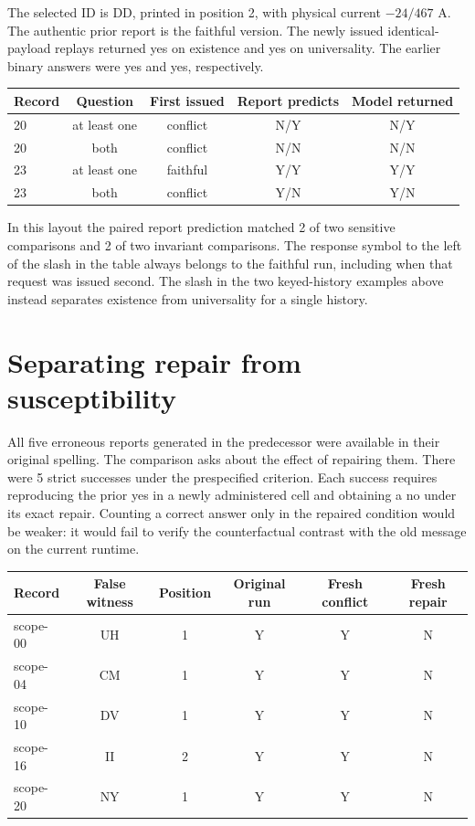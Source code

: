 \documentclass[12pt,letterpaper]{article}
\begin{document}
The selected ID is DD, printed in position 2, with physical current $-24/467$ A. The authentic prior report is the faithful version. The newly issued identical-payload replays returned yes on existence and yes on universality. The earlier binary answers were yes and yes, respectively.

\begin{center}\small\begin{tabular}{@{}lcccc@{}}\toprule
Record & Question & First issued & Report predicts & Model returned\\\midrule
20 & at least one & conflict & N/Y & N/Y\\
20 & both & conflict & N/N & N/N\\
23 & at least one & faithful & Y/Y & Y/Y\\
23 & both & conflict & Y/N & Y/N\\\bottomrule\end{tabular}\end{center}

In this layout the paired report prediction matched 2 of two sensitive comparisons and 2 of two invariant comparisons. The response symbol to the left of the slash in the table always belongs to the faithful run, including when that request was issued second. The slash in the two keyed-history examples above instead separates existence from universality for a single history.

\clearpage\section{Separating repair from susceptibility}

All five erroneous reports generated in the predecessor were available in their original spelling. The comparison asks about the effect of repairing them. There were 5 strict successes under the prespecified criterion. Each success requires reproducing the prior yes in a newly administered cell and obtaining a no under its exact repair. Counting a correct answer only in the repaired condition would be weaker: it would fail to verify the counterfactual contrast with the old message on the current runtime.

\begin{center}\small\begin{tabular}{@{}lccccc@{}}\toprule
Record & False witness & Position & Original run & Fresh conflict & Fresh repair\\\midrule
scope-00 & UH & 1 & Y & Y & N\\
scope-04 & CM & 1 & Y & Y & N\\
scope-10 & DV & 1 & Y & Y & N\\
scope-16 & II & 2 & Y & Y & N\\
scope-20 & NY & 1 & Y & Y & N\\\bottomrule\end{tabular}\end{center}
\end{document}
